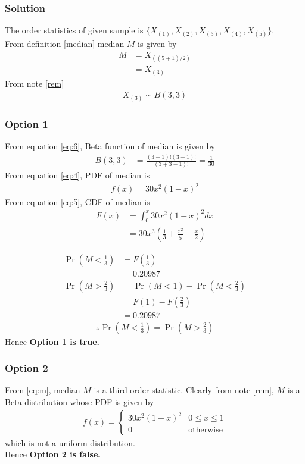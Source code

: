 \documentclass{beamer}
\providecommand{\pr}[1]{\ensuremath{\Pr\left(#1\right)}}
\begin{document}
\begin{frame}
\frametitle{Solution}
The order statistics of given sample is $\{X_{(1)},X_{(2)},X_{(3)},X_{(4)},X_{(5)}\}$.\\
From definition \eqref{median} median $M$ is given by
\begin{align}
  M &= X_{((5+1)/2)}\\
  &=X_{(3)}\label{eq:m}
\end{align}
From note \eqref{rem} 
\begin{align}
X_{(3)} \sim B(3,3)
\end{align}
 \end{frame}

\begin{frame}
\frametitle{Option 1}
From equation \eqref{eq:6}, Beta function of median is given by
\begin{align}
    B(3,3)&=\frac{(3-1)!(3-1)!}{(3+3-1)!}=\frac{1}{30}
 \end{align}
 From equation \eqref{eq:4}, PDF of median is
 \begin{align}
     f(x)=30x^{2}(1-x)^{2}
 \end{align}
 From equation \eqref{eq:5}, CDF of median is 
 \begin{align}
     F(x)&=\int_{0}^{x}30x^{2}(1-x)^{2}dx\\
     &=30x^{3}\left(\frac{1}{3}+\frac{x^2}{5}-\frac{x}{2}\right)
 \end{align}
 \end{frame}
 \begin{frame}
 \begin{align}
     \pr{M<\frac{1}{3}}&=F\left(\frac{1}{3}\right)\\
     &=0.20987\\
     \pr{M>\frac{2}{3}}&=\pr{M<1}-\pr{M<\frac{2}{3}}\\
     &=F(1)-F\left(\frac{2}{3}\right)\\
     &=0.20987
      \end{align}
 \begin{align}
      \therefore \pr{M<\frac{1}{3}}=\pr{M>\frac{2}{3}}
 \end{align}
  Hence \textbf{Option 1 is true.}
\end{frame}
\begin{frame}
\frametitle{Option 2}
From \eqref{eq:m}, median $M$ is a third order statistic. Clearly from note \eqref{rem}, $M$ is a Beta distribution whose PDF is given by
\begin{align}
    f(x)=
    \begin{cases}
    30x^{2}(1-x)^{2} & 0 \leq x \leq 1\\
    0 & \text{otherwise}
    \end{cases}\label{eq:25}
\end{align}
which is not a uniform distribution.
\\Hence \textbf{Option 2 is false.}
    
\end{frame}
\end{document}
